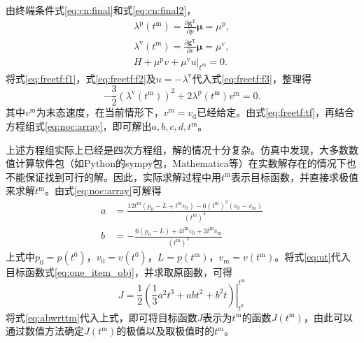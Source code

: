 由终端条件式\eqref{eq:cn:final}和式\eqref{eq:cn:final2}，
\begin{align}
\lambda^\mathrm{p}(t^\mathrm{m})=\frac{\partial \bm{g}^\mathrm{T}}{\partial p}\bm{\mu}=\mu^\mathrm{p},\label{eq:freetf:f1}\\
\lambda^\mathrm{v}(t^\mathrm{m})=\frac{\partial \bm{g}^\mathrm{T}}{\partial v}\bm{\mu}=\mu^\mathrm{v},\label{eq:freetf:f2}\\
\left. H+\mu^\mathrm{p}v+\mu^\mathrm{v}u\right|_{t^\mathrm{m}}=0.\label{eq:freetf:f3}
\end{align}
将式\eqref{eq:freetf:f1}，式\eqref{eq:freetf:f2}及$u=-\lambda^\mathrm{v}$代入式\eqref{eq:freetf:f3}，整理得
\begin{equation}
-\frac32(\lambda^\mathrm{v}(t^\mathrm{m}))^2+2\lambda^\mathrm{p}(t^\mathrm{m})v^\mathrm{m}=0.
\label{eq:freetf:tf}
\end{equation}
其中$v^\mathrm{m}$为末态速度，在当前情形下，$v^\mathrm{m}=v_\mathrm{d}$已经给定。由式\eqref{eq:freetf:tf}，再结合方程组式\eqref{eq:noc:array}，即可解出$a,b,c,d,t^\mathrm{m}$。

上述方程组实际上已经是四次方程组，解的情况十分复杂。仿真中发现，大多数数值计算软件包（如{\ttfamily Python}的{\ttfamily sympy}包，{\ttfamily Mathematica}等）在实数解存在的情况下也不能保证找到可行的解。因此，实际求解过程中用$t^\mathrm{m}$表示目标函数，并直接求极值来求解$t^\mathrm{m}$。由式\eqref{eq:noc:array}可解得
\begin{equation}
\begin{aligned}
a &= \frac{12t^\mathrm{m} (p_0 - L + t^\mathrm{m}v_0) - 6(t^\mathrm{m})^2(v_0 - v_\mathrm{m})}{(t^\mathrm{m})^4}\\
b &= -\frac{6(p_0 - L) + 4t^\mathrm{m}v_0 + 2t^\mathrm{m}v_\mathrm{m}}{(t^\mathrm{m})^2}
\end{aligned}
\label{eq:abwrttm}
\end{equation}
上式中$p_0=p(t^0)$，$v_0=v(t^0)$，$L=p(t^\mathrm{m})$，$v_\mathrm{m}=v(t^\mathrm{m})$。将式\eqref{eq:ut}代入目标函数式\eqref{eq:one_item_obj}，并求取原函数，可得
\begin{equation}
J=\left.\frac12(\frac13a^2t^3+abt^2+b^2t)\right|^{t^\mathrm{m}}_{t^0}
\label{eq:tmopt}
\end{equation}
将式\eqref{eq:abwrttm}代入上式，即可将目标函数$J$表示为$t^\mathrm{m}$的函数$J(t^\mathrm{m})$，由此可以通过数值方法确定$J(t^\mathrm{m})$的极值以及取极值时的$t^\mathrm{m}$。


